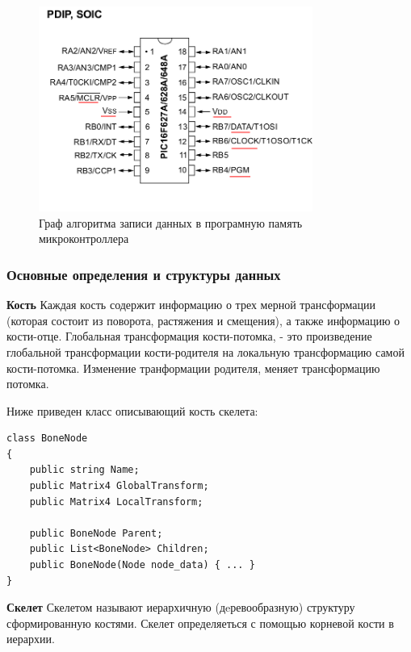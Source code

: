 \begin{figure}[h!]
    \centering
    \includegraphics[width=0.8\textwidth]{2017-05-07_at_22:31:52_screenshot.png}
    \caption{Граф алгоритма записи данных в програмную память микроконтроллера}
\end{figure}




\subsubsection{Основные определения и структуры данных}

\textbf{Кость}
Каждая кость содержит информацию о трех мерной трансформации (которая состоит из поворота, растяжения и смещения), а также информацию о кости-отце. Глобальная трансформация кости-потомка, - это произведение глобальной трансформации кости-родителя на локальную трансформацию самой кости-потомка. Изменение транформации родителя, меняет трансформацию потомка.

Ниже приведен класс описывающий кость скелета:
\begin{small}
\begin{verbatim}
class BoneNode
{
    public string Name;
    public Matrix4 GlobalTransform;
    public Matrix4 LocalTransform;

    public BoneNode Parent;
    public List<BoneNode> Children;
    public BoneNode(Node node_data) { ... }
}
\end{verbatim}
\end{small}

\textbf{Скелет}
Скелетом называют иерархичную (дeревообразную) структуру сформированную костями. Скелет определяеться с помощью корневой кости в иерархии.


